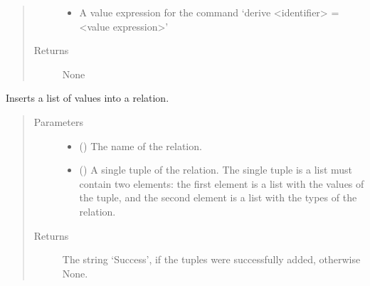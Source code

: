 \documentclass[letterpaper,10pt,english]{sphinxmanual}
\begin{document}
\begin{fulllineitems}
\begin{fulllineitems}
\begin{quote}
\begin{description}
\begin{itemize}
\item {} 
 \textendash{} A value expression for the command ‘derive \textless{}identifier\textgreater{} = \textless{}value expression\textgreater{}’

\end{itemize}

\item[{Returns}] \leavevmode
None

\end{description}\end{quote}

\end{fulllineitems}


\begin{fulllineitems}
\label{\detokenize{index:secondodb.api.secondoapi.Cursor.execute_insert_tuple_into_relation}}
Inserts a list of values into a relation.
\begin{quote}\begin{description}
\item[{Parameters}] \leavevmode\begin{itemize}
\item {} 
 () \textendash{} The name of the relation.

\item {} 
 (\sphinxstyleliteralemphasis{\sphinxupquote{{[}}}\sphinxstyleliteralemphasis{\sphinxupquote{{]}}}) \textendash{} A single tuple of the relation. The single tuple is a list must contain two elements: the
first element is a list with the values of the tuple, and the second element is a list with
the types of the relation.

\end{itemize}

\item[{Returns}] \leavevmode
The string ‘Success’, if the tuples were successfully added, otherwise None.

\end{description}\end{quote}


\end{fulllineitems}
\end{fulllineitems}
\end{document}
